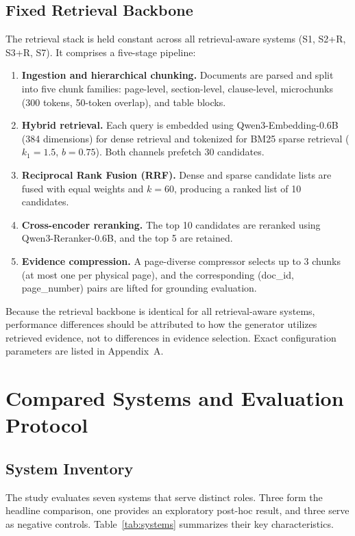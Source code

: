 \subsection{Fixed Retrieval Backbone}

The retrieval stack is held constant across all retrieval-aware systems (S1, S2+R, S3+R, S7). It comprises a five-stage pipeline:

\begin{enumerate}
    \item \textbf{Ingestion and hierarchical chunking.} Documents are parsed and split into five chunk families: page-level, section-level, clause-level, microchunks (300 tokens, 50-token overlap), and table blocks.
    \item \textbf{Hybrid retrieval.} Each query is embedded using Qwen3-Embedding-0.6B (384 dimensions) for dense retrieval and tokenized for BM25 sparse retrieval ($k_1 = 1.5$, $b = 0.75$). Both channels prefetch 30 candidates.
    \item \textbf{Reciprocal Rank Fusion (RRF).} Dense and sparse candidate lists are fused with equal weights and $k = 60$, producing a ranked list of 10 candidates.
    \item \textbf{Cross-encoder reranking.} The top 10 candidates are reranked using Qwen3-Reranker-0.6B, and the top 5 are retained.
    \item \textbf{Evidence compression.} A page-diverse compressor selects up to 3 chunks (at most one per physical page), and the corresponding (doc\_id, page\_number) pairs are lifted for grounding evaluation.
\end{enumerate}

Because the retrieval backbone is identical for all retrieval-aware systems, performance differences should be attributed to how the generator utilizes retrieved evidence, not to differences in evidence selection. Exact configuration parameters are listed in Appendix~A.

\newpage
\section{Compared Systems and Evaluation Protocol}

\subsection{System Inventory}

The study evaluates seven systems that serve distinct roles. Three form the headline comparison, one provides an exploratory post-hoc result, and three serve as negative controls. Table~\ref{tab:systems} summarizes their key characteristics.

